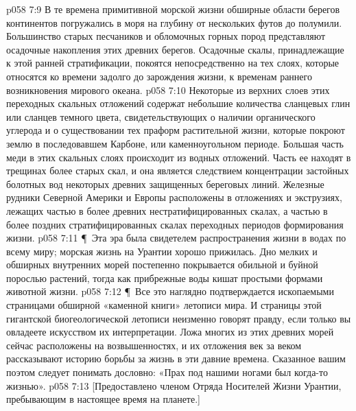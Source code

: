 \vs p058 7:9 В те времена примитивной морской жизни обширные области берегов континентов погружались в моря на глубину от нескольких футов до полумили. Большинство старых песчаников и обломочных горных пород представляют осадочные накопления этих древних берегов. Осадочные скалы, принадлежащие к этой ранней стратификации, покоятся непосредственно на тех слоях, которые относятся ко времени задолго до зарождения жизни, к временам раннего возникновения мирового океана.
\vs p058 7:10 Некоторые из верхних слоев этих переходных скальных отложений содержат небольшие количества сланцевых глин или сланцев темного цвета, свидетельствующих о наличии органического углерода и о существовании тех праформ растительной жизни, которые покроют землю в последовавшем Карбоне, или каменноугольном периоде. Большая часть меди в этих скальных слоях происходит из водных отложений. Часть ее находят в трещинах более старых скал, и она является следствием концентрации застойных болотных вод некоторых древних защищенных береговых линий. Железные рудники Северной Америки и Европы расположены в отложениях и экструзиях, лежащих частью в более древних нестратифицированных скалах, а частью в более поздних стратифицированных скалах переходных периодов формирования жизни.
\vs p058 7:11 \P\ Эта эра была свидетелем распространения жизни в водах по всему миру; морская жизнь на Урантии хорошо прижилась. Дно мелких и обширных внутренних морей постепенно покрывается обильной и буйной порослью растений, тогда как прибрежные воды кишат простыми формами животной жизни.
\vs p058 7:12 \P\ Все это наглядно подтверждается ископаемыми страницами обширной «каменной книги» летописи мира. И страницы этой гигантской биогеологической летописи неизменно говорят правду, если только вы овладеете искусством их интерпретации. Ложа многих из этих древних морей сейчас расположены на возвышенностях, и их отложения век за веком рассказывают историю борьбы за жизнь в эти давние времена. Сказанное вашим поэтом следует понимать дословно: «Прах под нашими ногами был когда\hyp{}то жизнью».
\vs p058 7:13 [Предоставлено членом Отряда Носителей Жизни Урантии, пребывающим в настоящее время на планете.]
